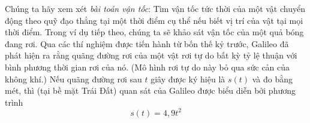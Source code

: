 \begin{minipage}[t]{0.69\textwidth}
    Chúng ta hãy xem xét \emph{bài toán vận tốc}: Tìm vận tốc tức thời của một vật chuyển động theo quỹ đạo thẳng tại một thời điểm cụ thể nếu biết vị trí của vật tại mọi thời điểm. Trong ví dụ tiếp theo, chúng ta sẽ khảo sát vận tốc của một quả bóng đang rơi. Qua các thí nghiệm được tiến hành từ bốn thế kỷ trước, Galileo đã phát hiện ra rằng quãng đường rơi của một vật rơi tự do bất kỳ tỷ lệ thuận với bình phương thời gian rơi của nó. (Mô hình rơi tự do này bỏ qua sức cản của không khí.) Nếu quãng đường rơi sau $t$ giây được ký hiệu là $s(t)$ và đo bằng mét, thì (tại bề mặt Trái Đất) quan sát của Galileo được biểu diễn bởi phương trình
    \begin{equation*}
    s(t) = 4{,}9t^2
    \end{equation*}

\end{minipage}
